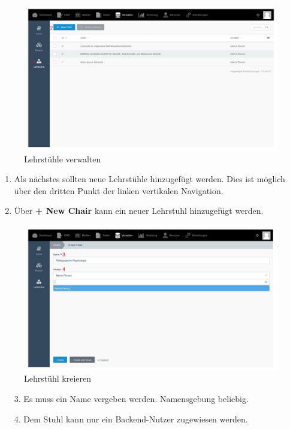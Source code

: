     \begin{figure}
    	\centering
    	\includegraphics[scale=0.5]{backend/img/chairs_1.pdf}
    	\caption{Lehrstühle verwalten}
    	\label{fig:manage_chair}
    \end{figure}

    \begin{enumerate}
      \item Als nächstes sollten neue Lehrstühle hinzugefügt werden. Dies ist möglich über den dritten Punkt der linken vertikalen Navigation.
     \item Über \textbf{+ New Chair} kann ein neuer Lehrstuhl hinzugefügt werden. 
    \end{enumerate}

	\begin{figure}
		\centering
		\includegraphics[scale=0.5]{backend/img/chairs_2.pdf}
		\caption{Lehrstühl kreieren}
		\label{fig:create_chair}
	\end{figure}

    
    \begin{enumerate}
     \item[3.] Es muss ein Name vergeben werden. Namensgebung beliebig.
     \item[4.] Dem Stuhl kann nur ein Backend-Nutzer zugewiesen werden.
    \end{enumerate}

